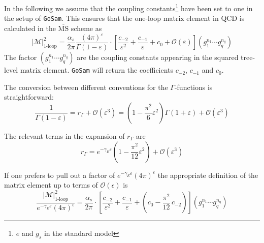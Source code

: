 \documentclass[11pt,a4paper]{refrep}
\newcommand{\golemversion}{{1{.}0}}
\newcommand{\golemv}[1][\golemversion]{{\tt GoSam}\xspace}
\begin{document}
In the following we assume that the coupling constants\footnote{
$e$ and $g_s$ in the standard model} have been set to one in the
setup of \golemv{}. This ensures that the one-loop matrix
element in QCD is calculated in the $\overline{\mathrm{MS}}$ scheme as
\begin{equation}
\left\vert\mathcal{M}\right\vert^2_{\text{1-loop}}=
\frac{\alpha_s}{2\pi}\frac{(4\pi)^\varepsilon}{\Gamma(1-\varepsilon)}
\cdot\left[\frac{c_{-2}}{\varepsilon^2}+\frac{c_{-1}}{\varepsilon}+c_0
+{\mathcal{O}}(\varepsilon)\right](g_1^{n_1}\cdots g_q^{n_q})
\end{equation}
The factor $(g_1^{n_1}\cdots g_q^{n_q})$ are the coupling constants
appearing in the squared tree-level matrix element. \golemv{} will
return the coefficients $c_{-2}$, $c_{-1}$ and $c_0$.

The conversion between different conventions for the $\Gamma$-functions
is straightforward:
\begin{equation}
\frac{1}{\Gamma(1-\varepsilon)}=r_\Gamma+{\mathcal O}(\varepsilon^3)=
\left(1-\frac{\pi^2}{6}\varepsilon^2\right)\Gamma(1+\varepsilon)
   +{\mathcal O}(\varepsilon^3)
\end{equation}

The relevant terms in the expansion of $r_\Gamma$ are
\begin{equation}
r_\Gamma=e^{-\gamma_E\varepsilon}
\left(1-\frac{\pi^2}{12}\varepsilon^2\right)+\mathcal{O}(\varepsilon^3)
\end{equation}

If one prefers to pull out a factor of
$e^{-\gamma_E\varepsilon}(4\pi)^{\varepsilon}$ the appropriate
definition of the matrix element up to terms of $\mathcal{O}(\epsilon)$ is
\begin{equation}
\frac{\left\vert\mathcal{M}\right\vert^2_{\text{1-loop}}}%
{e^{-\gamma_E\varepsilon}(4\pi)^\epsilon}=
\frac{\alpha_s}{2\pi}
\cdot\left[\frac{c_{-2}}{\varepsilon^2}+\frac{c_{-1}}{\varepsilon}
+\left(c_0-\frac{\pi^2}{12}\,c_{-2}\right)
\right](g_1^{n_1}\cdots g_q^{n_q})
\end{equation}
\end{document}

